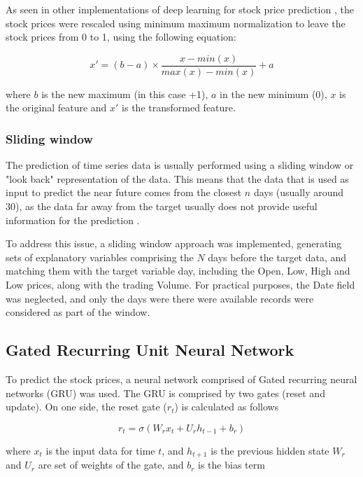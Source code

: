 \documentclass[10pt,twocolumn,letterpaper]{article}
\begin{document}
As seen in other implementations of deep learning for stock price prediction \cite{Zhao2020,Kara2011}, the stock prices were rescaled using minimum maximum normalization to leave the stock prices from 0 to 1, using the following equation:

\begin{equation}
	x' = (b-a) \times \frac{x - min(x)}{max(x)-min(x)} + a
\end{equation}

where $b$ is the new maximum (in this case +1), $a$ in the new minimum (0), $x$ is the original feature and $x'$ is the transformed feature.

\subsubsection{Sliding window}

The prediction of time series data is usually performed using a sliding window or "look back" representation of the data. This means that the data that is used as input to predict the near future comes from the closest $n$ days (usually around 30), as the data far away from the target usually does not provide useful information for the prediction \cite{Saud2020}.

To address this issue, a sliding window approach was implemented, generating sets of explanatory variables comprising the $N$ days before the target data, and matching them with the target variable day, including the Open, Low, High and Low prices, along with the trading Volume. For practical purposes, the Date field was neglected, and only the days were there were available records were considered as part of the window.

\subsection{Gated Recurring Unit Neural Network}

To predict the stock prices, a neural network comprised of Gated recurring neural networks (GRU) was used. The GRU is comprised by two gates (reset and update). On one side, the reset gate ($r_t$) is calculated as follows \cite{Chung2014}

\begin{equation}
	r_t = \sigma (W_r x_t + U_r h_{t-1} + b_r) 
\end{equation}

where $x_t$ is the input data for time $t$, and $h_{t+1}$ is the previous hidden state $W_r$ and $U_r$ are set of weights of the gate, and $b_r$ is the bias term
\end{document}
